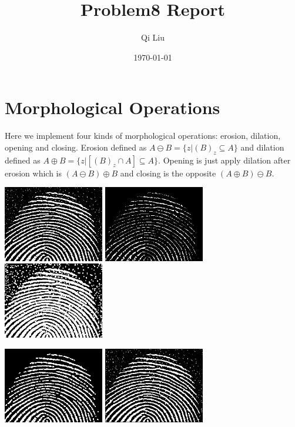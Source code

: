 \documentclass{article}
\title{Problem8 Report}
\author{Qi Liu}
\date{\today}
\begin{document}
	
\maketitle

\section{Morphological Operations}
Here we implement four kinds of morphological operations: erosion, dilation, opening and closing. Erosion defined as $A\ominus B=\{z|(B)_z\subseteq A\}$ and dilation defined as $A\oplus B=\{z|[(B)_z\cap A]\subseteq A\}$. Opening is just apply dilation after erosion which is $(A\ominus B)\oplus B$ and closing is the opposite $(A\oplus B)\ominus B$.

\includegraphics[width=0.33\textwidth]{../data/noisy_fingerprint.jpg}
\includegraphics[width=0.33\textwidth]{../data/erosion_noisy_fingerprint.jpg}
\includegraphics[width=0.33\textwidth]{../data/dilation_noisy_fingerprint.jpg}

\includegraphics[width=0.33\textwidth]{../data/opening_noisy_fingerprint.jpg}
\includegraphics[width=0.33\textwidth]{../data/closing_noisy_fingerprint.jpg}
\end{document}
